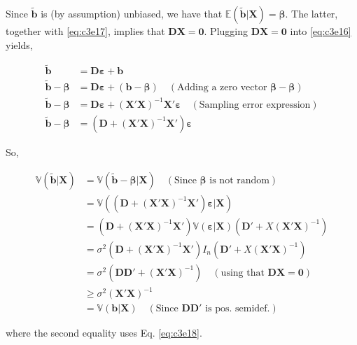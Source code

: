 \documentclass[]{book}
\theoremstyle{definition}
\theoremstyle{definition}
\theoremstyle{definition}
\theoremstyle{remark}
\begin{document}
Since \(\tilde{\mathbf{b}}\) is (by assumption) unbiased, we have that
\(\mathbb{E}(\tilde{\mathbf{b}}|\mathbf{X})=\boldsymbol{\beta}\). The latter, together with \eqref{eq:c3e17}, implies that \(\mathbf{D}\mathbf{X}=\mathbf{0}\). Plugging \(\mathbf{D}\mathbf{X}=\mathbf{0}\) into \eqref{eq:c3e16} yields,

\[
\begin{align*}
\tilde{\mathbf{b}}&=\mathbf{D}\boldsymbol{\varepsilon} + \mathbf{b}\nonumber\\
\tilde{\mathbf{b}}-\boldsymbol{\beta}&=\mathbf{D}\boldsymbol{\varepsilon} + (\mathbf{b}-\boldsymbol{\beta})\quad(\text{Adding a zero vector $\boldsymbol{\beta}-\boldsymbol{\beta}$})\nonumber\\
\tilde{\mathbf{b}}-\boldsymbol{\beta}&=\mathbf{D}\boldsymbol{\varepsilon} + \left(\mathbf{X}'\mathbf{X}\right)^{-1}\mathbf{X}'\boldsymbol{\varepsilon}\quad(\text{Sampling error expression})\nonumber\\
\tilde{\mathbf{b}}-\boldsymbol{\beta}&=\left(\mathbf{D} + \left(\mathbf{X}'\mathbf{X}\right)^{-1}\mathbf{X}'\right)\boldsymbol{\varepsilon}
\label{eq:c3e18}
\end{align*}
\]

So,

\[
\begin{align*}
  \mathbb{V}(\tilde{\mathbf{b}}|\mathbf{X})
  &= \mathbb{V}(\tilde{\mathbf{b}}-\boldsymbol{\beta}|\mathbf{X})\quad\left(\text{Since } \boldsymbol{\beta} \text{ is not random}\right)\\
  &= \mathbb{V}((\mathbf{D} + (\mathbf{X}'\mathbf{X})^{-1}\mathbf{X}')\boldsymbol{\varepsilon}|\mathbf{X})\\
  &= (\mathbf{D} + (\mathbf{X}'\mathbf{X})^{-1}\mathbf{X}')\mathbb{V}(\boldsymbol{\varepsilon}|\mathbf{X})(\mathbf{D}' + X(\mathbf{X}'\mathbf{X})^{-1})\\
  &= \sigma^2(\mathbf{D} + (\mathbf{X}'\mathbf{X})^{-1}\mathbf{X}')I_n(\mathbf{D}' + X(\mathbf{X}'\mathbf{X})^{-1})\\
  &= \sigma^2\left(\mathbf{D}\mathbf{D}'+(\mathbf{X}'\mathbf{X})^{-1}\right)\quad(\text{using that } \mathbf{D}\mathbf{X}=\mathbf{0}) \\
  &\geq\sigma^2(\mathbf{X}'\mathbf{X})^{-1} \\
  &= \mathbb{V}(\mathbf{b}|\mathbf{X}) \quad(\text{Since }\mathbf{D}\mathbf{D}' \text{ is pos.~semidef.})
\end{align*}
\]

where the second equality uses Eq. \eqref{eq:c3e18}.
\end{document}
